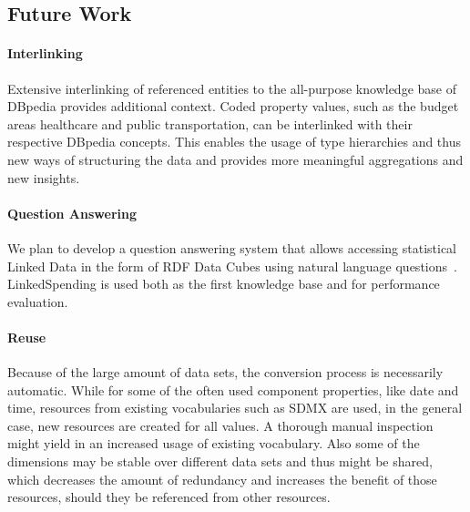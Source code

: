 \documentclass[sw]{iosart2x}
\begin{document}
\subsection{Future Work}

\paragraph{Interlinking}
Extensive interlinking of referenced entities to the all-purpose knowledge base of DBpedia provides additional context.
Coded property values, such as the budget areas healthcare and public transportation, can be interlinked with their respective DBpedia concepts.
This enables the usage of type hierarchies and thus new ways of structuring the data and provides more meaningful aggregations and new insights.

\paragraph{Question Answering}
We plan to develop a question answering system that allows accessing statistical Linked Data in the form of RDF Data Cubes using natural language questions~\cite{statisticalqashort}.
LinkedSpending is used both as the first knowledge base and for performance evaluation.


\iffalse
\paragraph{Reuse}
Because of the large amount of data sets, the conversion process is necessarily automatic.
While for some of the often used component properties, like date and time, resources from existing vocabularies such as SDMX are used, in the general case, new resources are created for all values.
A thorough manual inspection might yield in an increased usage of existing vocabulary.
Also some of the dimensions may be stable over different data sets and thus might be shared, which decreases the amount of redundancy and increases the benefit of those resources, should they be referenced from other resources.
\end{document}
